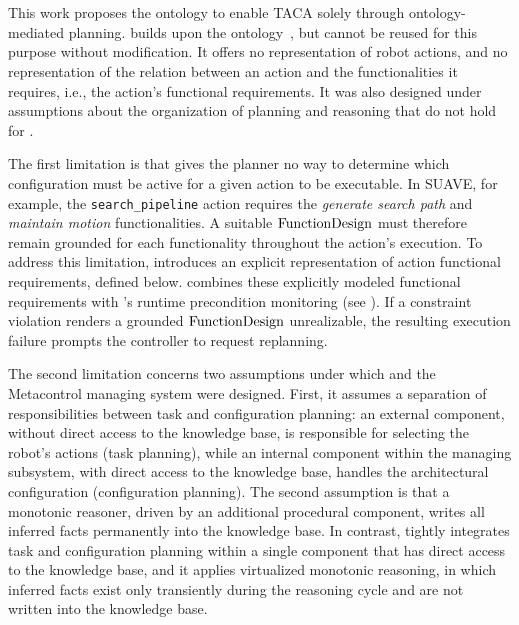 \section{\pddltomasys}\label{planta:sec:tomasys_pddl}

This work proposes the \pddltomasys ontology to enable TACA solely through ontology-mediated planning. \pddltomasys builds upon the \tomasys ontology~\cite{aguado2021functional,corbato2013model}, but \tomasys cannot be reused for this purpose without modification. It offers no representation of robot actions, and no representation of the relation between an action and the functionalities it requires, i.e., the action's functional requirements. It was also designed under assumptions about the organization of planning and reasoning that do not hold for \planta. %

The first limitation is that \tomasys gives the planner no way to determine which configuration must be active for a given action to be executable. In SUAVE, for example, the \texttt{search\_pipeline} action requires the \emph{generate search path} and \emph{maintain motion} functionalities. A suitable $\operatorname{FunctionDesign}$ must therefore remain grounded for each functionality throughout the action's execution. To address this limitation, \pddltomasys introduces an explicit representation of action functional requirements, defined below. \planta combines these explicitly modeled functional requirements with \planta's runtime precondition monitoring (see ). If a constraint violation renders a grounded $\operatorname{FunctionDesign}$ unrealizable, the resulting execution failure prompts the \planta controller to request replanning. %

The second limitation concerns two assumptions under which \tomasys and the Metacontrol managing system were designed. First, it assumes a separation of responsibilities between task and configuration planning: an external component, without direct access to the knowledge base, is responsible for selecting the robot's actions (task planning), while an internal component within the managing subsystem, with direct access to the knowledge base, handles the architectural configuration (configuration planning). The second assumption is that a monotonic reasoner, driven by an additional procedural component, writes all inferred facts permanently into the knowledge base. In contrast, \planta tightly integrates task and configuration planning within a single component that has direct access to the knowledge base, and it applies virtualized monotonic reasoning, in which inferred facts exist only transiently during the reasoning cycle and are not written into the knowledge base.

